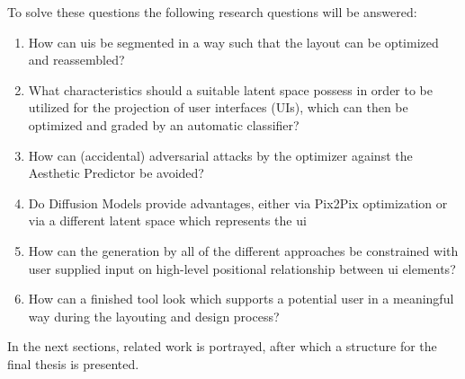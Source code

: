 \documentclass[10pt,a4paper]{scrartcl} %
\begin{document}
To solve these questions the following research questions will be answered:
\begin{enumerate}[label*=RQ \arabic*]
  \item How can \acp{ui} be segmented in a way such that the layout can be optimized and reassembled?
  \item What characteristics should a suitable latent space possess in order to be utilized for the projection of user interfaces (UIs), which can then be optimized and graded by an automatic classifier?
  \item How can (accidental) adversarial attacks by the optimizer against the Aesthetic Predictor be avoided?
  \item Do Diffusion Models provide advantages, either via Pix2Pix optimization or via a different latent space which represents the \ac{ui}
  \item How can the generation by all of the different approaches be constrained with user supplied input on high-level positional relationship between \ac{ui} elements?
  \item How can a finished tool look which supports a potential user in a meaningful way during the layouting and design process?

  
\end{enumerate}
In the next sections, related work is portrayed, after which a structure for the final thesis is presented.
\end{document}
